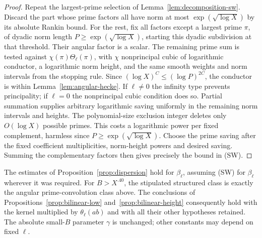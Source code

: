 \begin{proof}
Repeat the largest-prime selection of
Lemma~\ref{lem:decomposition-sw}. Discard the part whose prime
factors all have norm at most $\exp(\sqrt{\log X})$ by its
absolute Rankin bound. For the rest, fix all factors except a
largest prime $\pi$, of dyadic norm length
$P\ge\exp(\sqrt{\log X})$, starting this dyadic subdivision
at that threshold. Their angular factor is a scalar.
The remaining prime sum is tested against
$\chi(\pi)\Theta_\ell(\pi)$, with $\chi$ nonprincipal cubic
of logarithmic conductor, a logarithmic norm height, and the
same smooth weights and norm intervals from the stopping rule.
Since $(\log X)^C\le(\log P)^{2C}$, the conductor is within
Lemma~\ref{lem:angular-hecke}. If $\ell\ne0$ the infinity type
prevents principality; if $\ell=0$ the nonprincipal cubic
condition does so. Partial summation supplies arbitrary logarithmic
saving uniformly in the remaining norm intervals and heights.
The polynomial-size exclusion integer deletes only $O(\log X)$
possible primes. This costs a logarithmic power per fixed
complement, harmless since $P\ge\exp(\sqrt{\log X})$.
Choose the prime saving after the fixed coefficient multiplicities,
norm-height powers and desired saving. Summing the complementary
factors then gives precisely the bound in \textup{(SW)}.
\end{proof}

\begin{proposition}
\label{prop:angular-dispersion}
The estimates of Proposition~\ref{prop:dispersion} hold for
$\beta_\ell$, assuming \textup{(SW)} for $\beta_\ell$ wherever
it was required. For $B>X^{.40}$, the stipulated structured
class is exactly the angular prime-convolution class above.
The conclusions of Propositions~\ref{prop:bilinear-low}
and~\ref{prop:bilinear-height} consequently hold with the kernel
multiplied by $\theta_\ell(ab)$ and with all their other
hypotheses retained. The absolute small-$B$ parameter $\gamma$
is unchanged; other constants may depend on fixed $\ell$.
\end{proposition}

